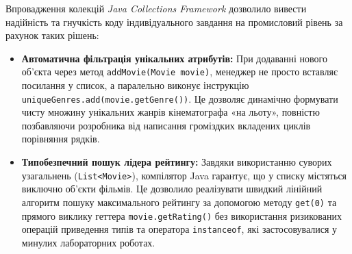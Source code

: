 Впровадження колекцій \textit{Java Collections Framework} дозволило вивести 
надійність та гнучкість коду індивідуального завдання на промисловий рівень за 
рахунок таких рішень:
\begin{itemize}
    \item \textbf{Автоматична фільтрація унікальних атрибутів:} 
    При додаванні нового об'єкта через метод \texttt{addMovie(Movie movie)}, 
    менеджер не просто вставляє посилання у список, а паралельно виконує 
    інструкцію \texttt{uniqueGenres.add(movie.getGenre())}. Це дозволяє динамічно 
    формувати чисту множину унікальних жанрів кінематографа «на льоту», повністю 
    позбавляючи розробника від написання громіздких вкладених циклів порівняння рядків.

    \item \textbf{Типобезпечний пошук лідера рейтингу:} 
    Завдяки використанню суворих узагальнень (\texttt{List<Movie>}), компілятор 
    Java гарантує, що у списку містяться виключно об'єкти фільмів. Це дозволило 
    реалізувати швидкий лінійний алгоритм пошуку максимального рейтингу за допомогою 
    методу \texttt{get(0)} та прямого виклику геттера \texttt{movie.getRating()} без 
    використання ризикованих операцій приведення типів та оператора \texttt{instanceof}, 
    які застосовувалися у минулих лабораторних роботах.
\end{itemize}
